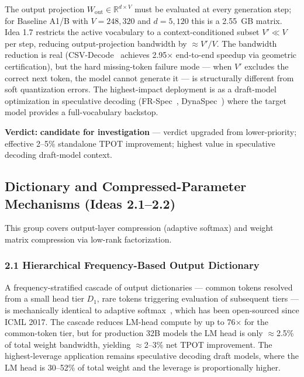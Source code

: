 \documentclass[11pt]{article}
\begin{document}
The output projection $W_{\text{out}} \in \mathbb{R}^{d \times V}$ must be evaluated at every generation step; for Baseline A1/B with $V = 248{,}320$ and $d = 5{,}120$ this is a 2.55~GB matrix.
Idea 1.7 restricts the active vocabulary to a context-conditioned subset $V' \ll V$ per step, reducing output-projection bandwidth by $\approx V'/V$.
The bandwidth reduction is real (CSV-Decode~\cite{CSVDecode2025} achieves 2.95$\times$ end-to-end speedup via geometric certification), but the hard missing-token failure mode --- when $V'$ excludes the correct next token, the model cannot generate it --- is structurally different from soft quantization errors.
The highest-impact deployment is as a draft-model optimization in speculative decoding (FR-Spec~\cite{Zhao2025FRSpec}, DynaSpec~\cite{Zhang2025DynaSpec}) where the target model provides a full-vocabulary backstop.

\textbf{Verdict:} \textbf{candidate for investigation} --- verdict upgraded from lower-priority; effective 2--5\% standalone TPOT improvement; highest value in speculative decoding draft-model context.

\subsection{Dictionary and Compressed-Parameter Mechanisms (Ideas 2.1--2.2)}
\label{sec:group2}

This group covers output-layer compression (adaptive softmax) and weight matrix compression via low-rank factorization.

\subsubsection{2.1 Hierarchical Frequency-Based Output Dictionary}
\label{sec:idea_2_1}

A frequency-stratified cascade of output dictionaries --- common tokens resolved from a small head tier $D_1$, rare tokens triggering evaluation of subsequent tiers --- is mechanically identical to adaptive softmax~\cite{Grave2017AdaptiveSoftmax}, which has been open-sourced since ICML 2017.
The cascade reduces LM-head compute by up to 76$\times$ for the common-token tier, but for production 32B models the LM head is only $\approx$2.5\% of total weight bandwidth, yielding $\approx$2--3\% net TPOT improvement.
The highest-leverage application remains speculative decoding draft models, where the LM head is 30--52\% of total weight and the leverage is proportionally higher.
\end{document}
